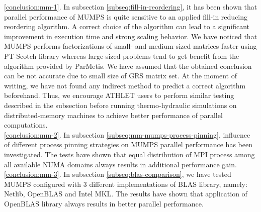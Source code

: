 \ref{conclusion:mm-1}. In subsection \ref{subseq:fill-in-reordering}, it has been shown that parallel performance of MUMPS is quite sensitive to an applied fill-in reducing reordering algorithm. A correct choice of the algorithm can lead to a significant improvement in execution time and strong scaling behavior. We have noticed that MUMPS performs factorizations of small- and medium-sized matrices faster using PT-Scotch library whereas large-sized problems tend to get benefit from the algorithm provided by ParMetis. We have assumed that the obtained conclusion can be not accurate due to small size of GRS matrix set. At the moment of writing,  we have not found any indirect method to predict a correct algorithm beforehand. Thus, we encourage ATHLET users to perform similar testing described in the subsection before running thermo-hydraulic simulations on distributed-memory machines to achieve better performance of parallel computations.\\




\ref{conclusion:mm-2}. In subsection \ref{subseq:mm-mumps-process-pinning}, influence of different process pinning strategies on MUMPS parallel performance has been investigated. The tests have shown that equal distribution of MPI process among all available NUMA domains always results in additional performance gain.\\ %


\ref{conclusion:mm-3}. 
In subsection \ref{subseq:blas-comparison},
we have tested MUMPS configured with 3 different implementations of BLAS library, namely: Netlib, OpenBLAS and Intel MKL. The results have shown that application of OpenBLAS library always results in better parallel performance.\\





